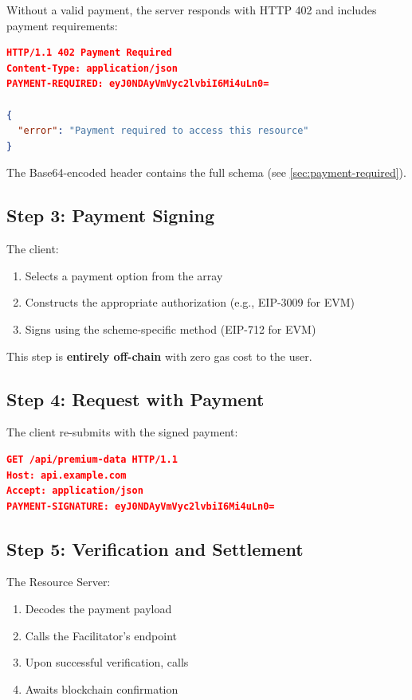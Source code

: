 Without a valid payment, the server responds with HTTP 402 and includes payment requirements:

\begin{lstlisting}[language=json,caption={HTTP 402 response with payment requirements}]
HTTP/1.1 402 Payment Required
Content-Type: application/json
PAYMENT-REQUIRED: eyJ0NDAyVmVyc2lvbiI6Mi4uLn0=

{
  "error": "Payment required to access this resource"
}
\end{lstlisting}

The Base64-encoded  header contains the full  schema (see \cref{sec:payment-required}).

\subsection{Step 3: Payment Signing}

The client:
\begin{enumerate}
    \item Selects a payment option from the  array
    \item Constructs the appropriate authorization (e.g., EIP-3009 for EVM)
    \item Signs using the scheme-specific method (EIP-712 for EVM)
\end{enumerate}

This step is \textbf{entirely off-chain} with zero gas cost to the user.

\subsection{Step 4: Request with Payment}

The client re-submits with the signed payment:

\begin{lstlisting}[language=json,caption={Request with payment signature}]
GET /api/premium-data HTTP/1.1
Host: api.example.com
Accept: application/json
PAYMENT-SIGNATURE: eyJ0NDAyVmVyc2lvbiI6Mi4uLn0=
\end{lstlisting}

\subsection{Step 5: Verification and Settlement}

The Resource Server:
\begin{enumerate}
    \item Decodes the payment payload
    \item Calls the Facilitator's  endpoint
    \item Upon successful verification, calls 
    \item Awaits blockchain confirmation
\end{enumerate}

